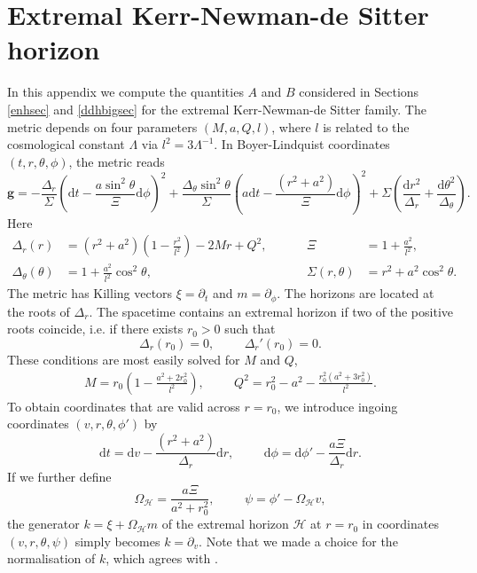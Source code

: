 \documentclass[11pt, reqno]{amsart}
\theoremstyle{plain}
\theoremstyle{definition}
\numberwithin{equation}{section}
\begin{document}
\section{Extremal Kerr-Newman-de Sitter horizon } \label{Aa}
In this appendix we compute the quantities $A$ and $B$ considered in Sections \ref{enhsec} and \ref{ddhbigsec} for the extremal Kerr-Newman-de Sitter family. The metric depends on four parameters $(M,a,Q,l)$, where $l$ is related to the cosmological constant $\Lambda$ via $l^2 = 3\Lambda^{-1}$. In Boyer-Lindquist coordinates $(t,r,\theta,\phi)$, the metric reads
\begin{equation} \label{knds}
    \textbf{g} = -\frac{\Delta_r}{\Sigma}\left(\text{d}t - \frac{a\sin^2\theta}{\Xi}\text{d}\phi\right)^2 + \frac{\Delta_\theta\sin^2\theta}{\Sigma}\left(a\text{d}t - \frac{(r^2 + a^2)}{\Xi}\text{d}\phi\right)^2 + \Sigma\left(\frac{\text{d}r^2}{\Delta_r} + \frac{\text{d}\theta^2}{\Delta_\theta}\right).
\end{equation}
Here
\begin{align*}
    \Delta_r(r) &= (r^2 + a^2)\left(1 - \frac{r^2}{l^2}\right) - 2Mr + Q^2, \hspace{1cm} & \Xi &= 1 + \frac{a^2}{l^2}, \\
    \Delta_\theta(\theta) &= 1 + \frac{a^2}{l^2}\cos^2\theta, \hspace{1cm} & \Sigma(r,\theta) &= r^2 + a^2\cos^2\theta.
\end{align*}
The metric has Killing vectors $\xi = \partial_t$ and $m = \partial_\phi$. The horizons are located at the roots of $\Delta_r$. The spacetime contains an extremal horizon if two of the positive roots coincide, i.e. if there exists $r_0 > 0$ such that
\begin{equation*}
    \Delta_r(r_0) = 0, \hspace{1cm} \Delta_r'(r_0) = 0.
\end{equation*}
These conditions are most easily solved for $M$ and $Q$,
    \begin{align}
        M = r_0\left(1-\frac{a^2 + 2r_0^2}{l^2}\right), \hspace{1cm} Q^2 = r_0^2 - a^2-\frac{r_0^2(a^2 + 3r_0^2)}{l^2}.
    \end{align}
To obtain coordinates that are valid across $r = r_0$, we introduce ingoing coordinates $(v,r,\theta,\phi')$ by
\begin{equation*}
    \text{d}t = \text{d}v - \frac{(r^2 + a^2)}{\Delta_r}\text{d}r, \hspace{1cm} \text{d}\phi = \text{d}\phi' - \frac{a\Xi}{\Delta_r}\text{d}r.
\end{equation*}
If we further define  
\begin{equation*}
    \Omega_{\mathcal{H}} = \frac{a\Xi}{a^2 + r_0^2}, \hspace{1cm}\psi = \phi' - \Omega_{\mathcal{H}}v,
\end{equation*}
the generator $k = \xi + \Omega_{\mathcal{H}}m$ of the extremal horizon $\mathcal{H}$ at $r = r_0$ in coordinates $(v,r,\theta,\psi)$  simply becomes $k = \partial_v$. Note that we made a choice for the normalisation of $k$, which agrees with \cite{GLPP05}.
\end{document}
